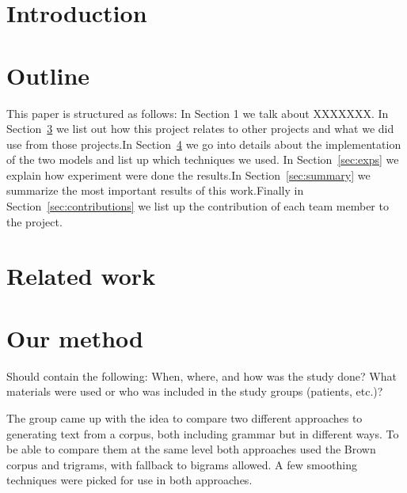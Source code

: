 \documentclass[a4paper,12pt]{article}
\begin{document}
\section{Introduction} %
\label{sec:intro}





\section{Outline}
This paper is structured as follows: In Section 1 we talk about XXXXXXX. In Section~\ref{sec:relwork} we list out how this project relates to other projects and what we did use from those projects.In Section~\ref{sec:method} we go into details about the implementation of the two models and list up which techniques we used. In Section~\ref{sec:exps} we explain how experiment were done the results.In Section~\ref{sec:summary} we summarize the most important results of this work.Finally in Section~\ref{sec:contributions} we list up the contribution of each team member to the project.

\section{Related work}
\label{sec:relwork}



\section{Our method}
\label{sec:method}

Should contain the following: When, where, and how was the study done? What materials were used or who was included in the study groups (patients, etc.)?

The group came up with the idea to compare two different approaches to generating text from a corpus, both including grammar but in different ways. To be able to compare them at the same level both approaches used the Brown corpus and trigrams, with fallback to bigrams allowed. A few smoothing techniques were picked for use in both approaches.
\end{document}
